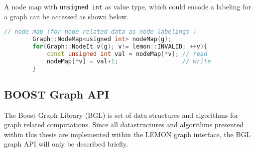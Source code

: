         A node map with  \lstinline{unsigned int} as value type,
        which could encode a labeling for a graph 
        can be accessed as shown below.

        \begin{lstlisting}[language=c++]
        // node map (for node related data as node labelings )
        Graph::NodeMap<usigned int> nodeMap(g);
        for(Graph::NodeIt v(g); v!= lemon::INVALID; ++v){
            const unsigned int val = nodeMap[*v]; // read
            nodeMap[*v] = val+1;                  // write
        }
        \end{lstlisting}




\subsection{BOOST Graph API}\label{sec:boost_graph_apis}
The Boost Graph Library (BGL)  \citep{boost_bgl} is set of data structures and 
algorithms for graph related computations.
Since all  datastructures and algorithms presented within this thesis  are implemented within the LEMON graph interface, 
the BGL graph API will only be described briefly.

